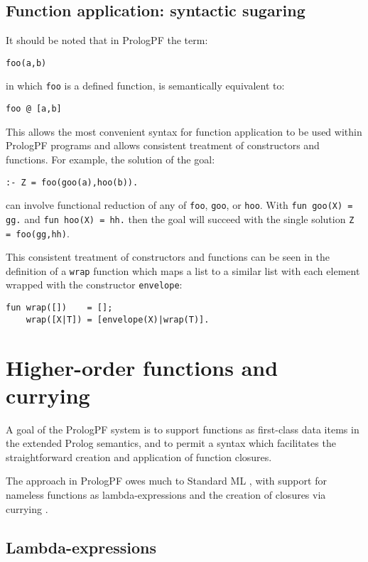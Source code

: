 \subsection{Function application: syntactic sugaring}
It should be noted that in PrologPF the term:

\texttt{foo(a,b)}

in which \texttt{foo} is a defined function, is semantically equivalent to:

\texttt{foo @ [a,b]}

This allows the most convenient syntax for function application to be used
within PrologPF programs and allows consistent treatment of constructors and
functions. For example, the solution of the goal:

\texttt{:- Z = foo(goo(a),hoo(b)).}

can involve functional reduction of any of \texttt{foo}, \texttt{goo}, or
\texttt{hoo}.  With
\texttt{fun goo(X) = gg.} and \texttt{fun hoo(X) = hh.} then the goal
will succeed with the single solution \texttt{Z = foo(gg,hh)}.

This consistent treatment of constructors and functions can be seen in the
definition of a \texttt{wrap}
function which maps a list to a similar list with each element wrapped with
the constructor \texttt{envelope}:
\begin{verbatim}
fun wrap([])    = [];
    wrap([X|T]) = [envelope(X)|wrap(T)].
\end{verbatim}

\section{Higher-order functions and currying} %
\label{higher-order}

A goal of the PrologPF system is to support functions as first-class data
items in the extended Prolog semantics, and to permit a syntax which 
facilitates the straightforward creation and application of function closures.

The approach in PrologPF owes much to Standard ML \cite{MTH90}, with support for
nameless functions as lambda-expressions and the creation of closures
via currying \cite{Cur30, Sch24}.

\subsection{Lambda-expressions}

